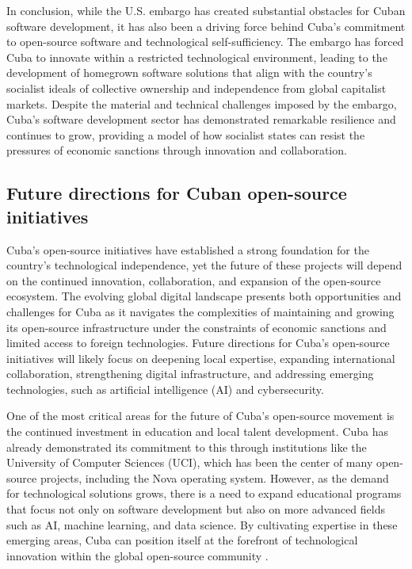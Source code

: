 \begin{refsection}
In conclusion, while the U.S. embargo has created substantial obstacles for Cuban software development, it has also been a driving force behind Cuba’s commitment to open-source software and technological self-sufficiency. The embargo has forced Cuba to innovate within a restricted technological environment, leading to the development of homegrown software solutions that align with the country’s socialist ideals of collective ownership and independence from global capitalist markets. Despite the material and technical challenges imposed by the embargo, Cuba’s software development sector has demonstrated remarkable resilience and continues to grow, providing a model of how socialist states can resist the pressures of economic sanctions through innovation and collaboration.

\subsection{Future directions for Cuban open-source initiatives}

Cuba’s open-source initiatives have established a strong foundation for the country’s technological independence, yet the future of these projects will depend on the continued innovation, collaboration, and expansion of the open-source ecosystem. The evolving global digital landscape presents both opportunities and challenges for Cuba as it navigates the complexities of maintaining and growing its open-source infrastructure under the constraints of economic sanctions and limited access to foreign technologies. Future directions for Cuba’s open-source initiatives will likely focus on deepening local expertise, expanding international collaboration, strengthening digital infrastructure, and addressing emerging technologies, such as artificial intelligence (AI) and cybersecurity.

One of the most critical areas for the future of Cuba’s open-source movement is the continued investment in education and local talent development. Cuba has already demonstrated its commitment to this through institutions like the University of Computer Sciences (UCI), which has been the center of many open-source projects, including the Nova operating system. However, as the demand for technological solutions grows, there is a need to expand educational programs that focus not only on software development but also on more advanced fields such as AI, machine learning, and data science. By cultivating expertise in these emerging areas, Cuba can position itself at the forefront of technological innovation within the global open-source community \cite[pp.~45-67]{feinberg}.


\end{refsection}
